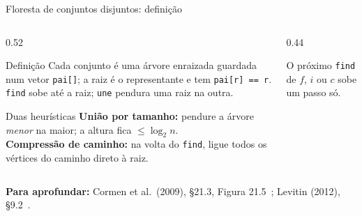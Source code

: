 \documentclass[aspectratio=169,xcolor=table]{beamer}
\newcommand{\fonte}[1]{%
  \vfill
  {\tiny\color{gray!55!black}\textbf{Para aprofundar:} #1\par}%
}
\begin{document}
\begin{frame}{Floresta de conjuntos disjuntos: definição}
  \begin{columns}[c]
    \begin{column}{0.52\textwidth}
      \begin{block}{Definição}
        \scriptsize Cada conjunto é uma árvore enraizada guardada num vetor \texttt{pai[]};
        a raiz é o representante e tem \texttt{pai[r] == r}. \texttt{find} sobe até a raiz;
        \texttt{une} pendura uma raiz na outra.
      \end{block}
      \begin{exampleblock}{Duas heurísticas}
        \scriptsize
        \textbf{União por tamanho:} pendure a árvore \emph{menor} na maior; a altura fica
        $\le \log_2 n$.\\[2pt]
        \textbf{Compressão de caminho:} na volta do \texttt{find}, ligue todos os vértices
        do caminho direto à raiz.
      \end{exampleblock}
    \end{column}
    \begin{column}{0.44\textwidth}
      \begin{center}
      \end{center}
      \scriptsize O próximo \texttt{find} de $f$, $i$ ou $c$ sobe um passo só.
    \end{column}
  \end{columns}
  \fonte{Cormen et al.\ (2009), \S 21.3, Figura 21.5~\cite{cormen2009introduction};
    Levitin (2012), \S 9.2~\cite{levitin2012introduction}.}
\end{frame}
\end{document}
